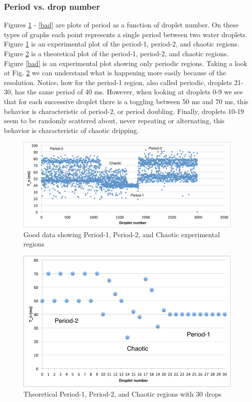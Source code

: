 \documentclass[11pt]{article}
\begin{document}
\subsubsection{Period vs. drop number}
 Figures \ref{together} - \ref{bad} are plots of period as a function of droplet number. On these types of graphs each point represents a single period between two water droplets. Figure \ref{together} is an experimental plot of the period-1, period-2, and chaotic regions. Figure \ref{together_th} is a theoretical plot of the period-1, period-2, and chaotic regions. Figure \ref{bad} is an experimental plot showing only periodic regions. Taking a look at Fig. \ref{together_th} we can understand what is happening more easily because of the resolution. Notice, how for the period-1 region, also called periodic, droplets 21-30, has the same period of 40 ms. However, when looking at droplets 0-9 we see that for each successive droplet there is a toggling between 50 ms and 70 ms, this behavior is characteristic of period-2, or period doubling. Finally, droplets 10-19 seem to be randomly scattered about, never repeating or alternating, this behavior is characteristic of chaotic dripping.
 
\newpage
\begin{figure}[htp]
\begin{center}
\includegraphics[width=5in]{figs/together}
\caption{ Good data showing Period-1, Period-2, and Chaotic experimental regions}
\label{together}
\end{center}
\end{figure}

\begin{figure}[htp]
\begin{center}
\includegraphics[width=4.6in]{figs/together_th}
\caption{Theoretical Period-1, Period-2, and Chaotic regions with 30 drops}
\label{together_th}
\end{center}
\end{figure}
\end{document}
